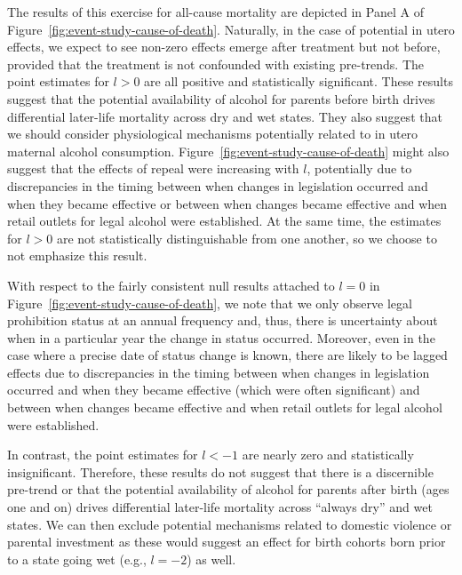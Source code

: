 \documentclass[12pt]{article}
\begin{document}
The results of this exercise for all-cause mortality are depicted in Panel A of Figure~\ref{fig:event-study-cause-of-death}. 
Naturally, in the case of potential in utero effects, we expect to see non-zero effects emerge after treatment but not before, provided that the treatment is not confounded with existing pre-trends. 
The point estimates for $l > 0$ are all positive and statistically significant. 
These results suggest that the potential availability of alcohol for parents before birth drives differential later-life mortality across dry and wet states. 
They also suggest that we should consider physiological mechanisms potentially related to in utero maternal alcohol consumption. 
Figure~\ref{fig:event-study-cause-of-death} might also suggest that the effects of repeal were increasing with $l$, potentially due to discrepancies in the timing between when changes in legislation occurred and when they became effective or between when changes became effective and when retail outlets for legal alcohol were established. 
At the same time, the estimates for $l > 0$ are not statistically distinguishable from one another, so we choose to not emphasize this result.   

With respect to the fairly consistent null results attached to $l = 0$ in Figure~\ref{fig:event-study-cause-of-death}, we note that we only observe legal prohibition status at an annual frequency and, thus, there is uncertainty about when in a particular year the change in status occurred. 
Moreover, even in the case where a precise date of status change is known, there are likely to be lagged effects due to discrepancies in the timing between when changes in legislation occurred and when they became effective (which were often significant) and between when changes became effective and when retail outlets for legal alcohol were established. 

In contrast, the point estimates for $l < -1$ are nearly zero and statistically insignificant. 
Therefore, these results do not suggest that there is a discernible pre-trend or that the potential availability of alcohol for parents after birth (ages one and on) drives differential later-life mortality across ``always dry'' and wet states. 
We can then exclude potential mechanisms related to domestic violence or parental investment as these would suggest an effect for birth cohorts born prior to a state going wet (e.g., $l = -2$) as well.
\end{document}
